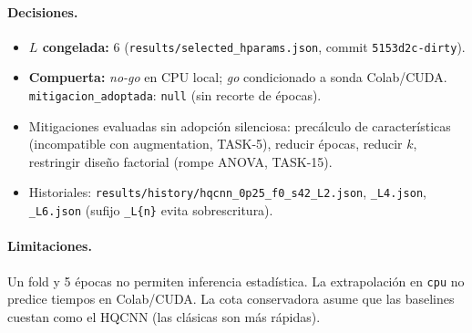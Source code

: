 \paragraph{Decisiones.}
\begin{itemize}
  \item \textbf{$L$ congelada:} 6 (\texttt{results/selected\_hparams.json}, commit
        \texttt{5153d2c-dirty}).
  \item \textbf{Compuerta:} \textit{no-go} en CPU local; \textit{go} condicionado a sonda
        Colab/CUDA. \texttt{mitigacion\_adoptada}: \texttt{null} (sin recorte de épocas).
  \item Mitigaciones evaluadas sin adopción silenciosa: precálculo de características
        (incompatible con augmentation, TASK-5), reducir épocas, reducir $k$, restringir
        diseño factorial (rompe ANOVA, TASK-15).
  \item Historiales: \texttt{results/history/hqcnn\_0p25\_f0\_s42\_L2.json},
        \texttt{\_L4.json}, \texttt{\_L6.json} (sufijo \texttt{\_L\{n\}} evita sobrescritura).
\end{itemize}

\paragraph{Limitaciones.}
Un fold y 5 épocas no permiten inferencia estadística. La extrapolación en \texttt{cpu}
no predice tiempos en Colab/CUDA. La cota conservadora asume que las baselines cuestan
como el HQCNN (las clásicas son más rápidas).
